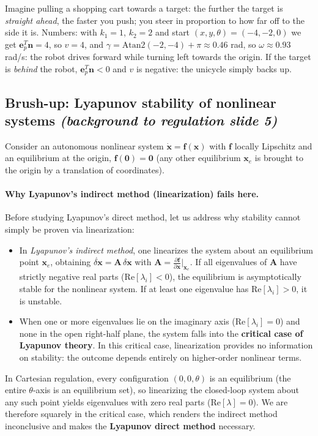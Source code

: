 \documentclass[11pt,a4paper]{article}
\theoremstyle{plain}
\theoremstyle{definition}
\theoremstyle{remark}
\begin{document}
\begin{intuition}
Imagine pulling a shopping cart towards a target: the further the target is \emph{straight ahead}, the faster you push; you steer in proportion to how far off to the side it is. Numbers: with $k_1=1$, $k_2=2$ and start $(x,y,\theta)=(-4,-2,0)$ we get $\bm e_p^T\bm n=4$, so $v=4$, and $\gamma=\mathrm{Atan2}(-2,-4)+\pi\approx0.46$ rad, so $\omega\approx0.93$ rad/s: the robot drives forward while turning left towards the origin. If the target is \emph{behind} the robot, $\bm e_p^T\bm n<0$ and $v$ is negative: the unicycle simply backs up.
\end{intuition}

\subsection{Brush-up: Lyapunov stability of nonlinear systems \emph{(background to regulation slide 5)}}\label{sec:lyap}

Consider an autonomous nonlinear system $\dot{\bm x}=\bm f(\bm x)$ with $\bm f$ locally Lipschitz and an equilibrium at the origin, $\bm f(\bm 0)=\bm 0$ (any other equilibrium $\bm x_e$ is brought to the origin by a translation of coordinates).

\paragraph{Why Lyapunov's indirect method (linearization) fails here.}
Before studying Lyapunov's direct method, let us address why stability cannot simply be proven via linearization:
\begin{itemize}[leftmargin=*]
\item In \emph{Lyapunov's indirect method}, one linearizes the system about an equilibrium point $\bm x_e$, obtaining $\dot{\delta\bm x} = \bm A\,\delta\bm x$ with $\bm A = \frac{\partial\bm f}{\partial\bm x}\big|_{\bm x_e}$. If all eigenvalues of $\bm A$ have strictly negative real parts ($\mathrm{Re}[\lambda_i] < 0$), the equilibrium is asymptotically stable for the nonlinear system. If at least one eigenvalue has $\mathrm{Re}[\lambda_i] > 0$, it is unstable.
\item When one or more eigenvalues lie on the imaginary axis ($\mathrm{Re}[\lambda_i] = 0$) and none in the open right-half plane, the system falls into the \textbf{critical case of Lyapunov theory}. In this critical case, linearization provides no information on stability: the outcome depends entirely on higher-order nonlinear terms.
\end{itemize}
In Cartesian regulation, every configuration $(0,0,\theta)$ is an equilibrium (the entire $\theta$-axis is an equilibrium set), so linearizing the closed-loop system about any such point yields eigenvalues with zero real parts ($\mathrm{Re}[\lambda]=0$). We are therefore squarely in the critical case, which renders the indirect method inconclusive and makes the \textbf{Lyapunov direct method} necessary.
\end{document}
